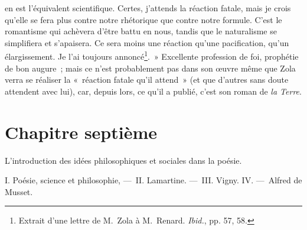 \documentclass[french,twoside]{book} %
\newcommand\chapteropen{} %
\newcommand\chaptercont{} %
\newcommand\chapterclose{} %
\begin{document}
en est l’équivalent scientifique. Certes, j’attends la réaction fatale, mais je crois qu’elle se fera plus contre notre rhétorique que contre notre formule. C’est le romantisme qui achèvera d’être battu en nous, tandis que le naturalisme se simplifiera et s’apaisera. Ce sera moins une réaction qu’une pacification, qu’un élargissement. Je l’ai toujours annoncé\footnote{ Extrait d’une lettre de M. Zola à M. Renard. \emph{Ibid.}, pp. 57, 58.}. » Excellente profession de foi, prophétie de bon augure ; mais ce n’est probablement pas dans son œuvre même que Zola verra se réaliser la « réaction fatale qu’il attend » (et que d’autres sans doute attendent avec lui), car, depuis lors, ce qu’il a publié, c’est son roman de \emph{la Terre}.
\chapterclose


\chapteropen
\chapter[{Chapitre septième}]{Chapitre septième}\renewcommand{\leftmark}{Chapitre septième}

\begin{center}L’introduction des idées philosophiques et sociales dans la poésie.\end{center}

\chaptercont
\noindent I. Poésie, science et philosophie, — II. Lamartine. — III. Vigny. IV. — Alfred de Musset.\par
\end{document}

